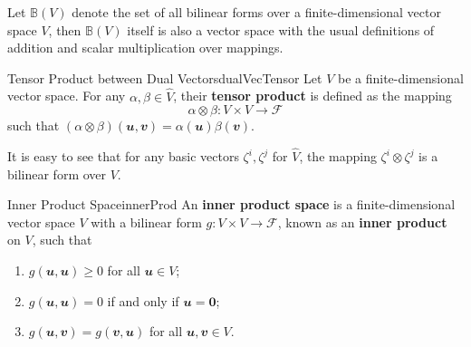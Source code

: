\documentclass[math, code]{amznotes}
\theoremstyle{remark}
\newcommand{\zero}{\mathbf{0}}
\begin{document}
Let $\mathbb{B}(V)$ denote the set of all bilinear forms over a finite-dimensional vector space $V$, then $\mathbb{B}(V)$ itself is also a vector space with the usual definitions of addition and scalar multiplication over mappings.
\begin{dfnbox}{Tensor Product between Dual Vectors}{dualVecTensor}
    Let $V$ be a finite-dimensional vector space. For any $\alpha, \beta \in \hat{V}$, their {\color{red} \textbf{tensor product}} is defined as the mapping 
    \begin{equation*}
        \alpha \otimes \beta \colon V \times V \to \mathcal{F}
    \end{equation*}
    such that $(\alpha \otimes \beta)(\mathbfit{u}, \mathbfit{v}) = \alpha(\mathbfit{u})\beta(\mathbfit{v})$.
\end{dfnbox}
It is easy to see that for any basic vectors $\zeta^i, \zeta^j$ for $\hat{V}$, the mapping $\zeta^i \otimes \zeta^j$ is a bilinear form over $V$.
\begin{dfnbox}{Inner Product Space}{innerProd}
    An {\color{red} \textbf{inner product space}} is a finite-dimensional vector space $V$ with a bilinear form $g \colon V \times V \to \mathcal{F}$, known as an {\color{red} \textbf{inner product}} on $V$, such that
    \begin{enumerate}
        \item $g(\mathbfit{u}, \mathbfit{u}) \geq 0$ for all $\mathbfit{u} \in V$;
        \item $g(\mathbfit{u}, \mathbfit{u}) = 0$ if and only if $\mathbfit{u} = \zero$;
        \item $g(\mathbfit{u}, \mathbfit{v}) = g(\mathbfit{v}, \mathbfit{u})$ for all $\mathbfit{u}, \mathbfit{v} \in V$.
    \end{enumerate}
\end{dfnbox}
\end{document}
